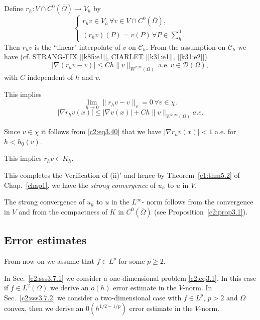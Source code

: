  Define $r_h : V \cap C^0 (\overline{\Omega}) \to V_h$ by 
\begin{equation}
\begin{cases}
r_h v \in V_h\, \forall  v \in V \cap C^0 (\overline{\Omega}), \\
(r_h v) (P) = v (P)\, \forall  P \in
\sum\limits^{0}_{h}.\tag{3.37}\label{c2:eq3.37}   
\end{cases}
\end{equation} 
 Then $r_h v$ is the ``linear" interpolate of $v$ on
 $\mathscr{C}_h$. From the assumption on $\mathscr{C}_h$ we have
 (cf. STRANG-FIX [\ref{k85:e1}], CIARLET [\ref{k31:e1}], [\ref{k31:e2}]) 
\begin{equation}
|\nabla (r_h v - v)| \leq Ch \parallel  v \parallel_{W^{2, \infty}(\Omega)}
~\text{a.e.}~ v \in \mathscr{D} (\Omega), \tag{3.38}\label{c2:eq3.38} 
 \end{equation} 
with $C$ independent of $h$ and $v$.
 
This implies 
\begin{equation}
\lim\limits_{h \to 0} \parallel  r_h v - v \parallel  _v = 0\, \forall  v \in
\chi.\tag{3.39}\label{c2:eq3.39} 
\end{equation} 
\begin{equation}
|\nabla r_h v(x) | \leq | \nabla v(x) | + C h \parallel  v
\parallel  _{W^{2, \infty}(\Omega)} a.e.\tag{3.40}\label{c2:eq3.40} 
\end{equation}\pageoriginale 
 
Since $v \in \chi$ it follows from \eqref{c2:eq3.40} that we have
$|\nabla r_h v(x)| < 1$ a.e. for $h < h_0 (v)$. 
 
This implies $r_h v \in K_h$.
 
 This completes the Verification of (ii)$'$ and hence by Theorem~\ref{c1:thm5.2} of
 Chap.~\ref{chap1}, we have the \textit{strong convergence} of $u_h $ to $u$ in
 $V$. 
 
 The strong convergence of $u_h$ to $u$ in the $L^\infty$- norm
 follows from the convergence in $V$ and from the compactness of $K$
 in $C^0 (\overline{\Omega})$ (see Proposition~\ref{c2:prop3.1}). 
 
 \subsection{Error estimates}\label{c2:ss3.7}%
 
 From now on we assume that $f \in L^p$ for some $p \geq 2$. 
 
   In Sec.~\ref{c2:sss3.7.1} we consider a one-dimensional problem
   \eqref{c2:eq3.1}. In this 
   case if $f \in L^2 (\Omega)$ we derive an $o(h)$ error
   estimate in the $V$-norm. In Sec.~\ref{c2:sss3.7.2} we consider a
   two-dimensional case with $f \in L^p$, $p > 2$ and $\Omega$
   convex, then we derive an $0(h^{1/2 - 1/p})$ error estimate in the
   $V$-norm.  
 
